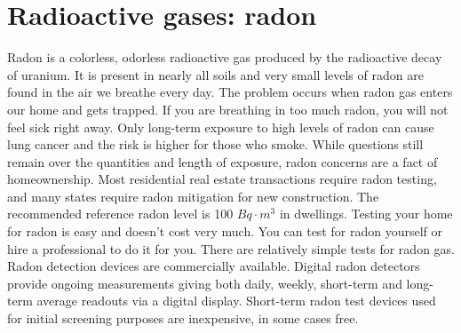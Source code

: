 \documentclass[main.tex]{subfiles}
\begin{document}
\section{Radioactive gases: radon}
Radon is a colorless, odorless radioactive gas produced by the radioactive decay of uranium. It is present in nearly all soils and very small levels of radon are found in the air we breathe every day. The problem occurs when radon gas enters our home and gets trapped. If you are breathing in too much radon, you will not feel sick right away. Only long-term exposure to high levels of radon can cause lung cancer and the risk is higher for those who smoke. While questions still remain over the quantities and length of exposure, radon concerns are a fact of homeownership. Most residential real estate transactions require radon testing, and many states require radon mitigation for new construction. The recommended reference radon level is 100 $Bq\cdot m^3$ in dwellings. 
Testing your home for radon is easy and doesn't cost very much. You can test for radon yourself or hire a professional to do it for you. There are relatively simple tests for radon gas. Radon detection devices are commercially available. Digital radon detectors provide ongoing measurements giving both daily, weekly, short-term and long-term average readouts via a digital display. Short-term radon test devices used for initial screening purposes are inexpensive, in some cases free.
\end{document}
